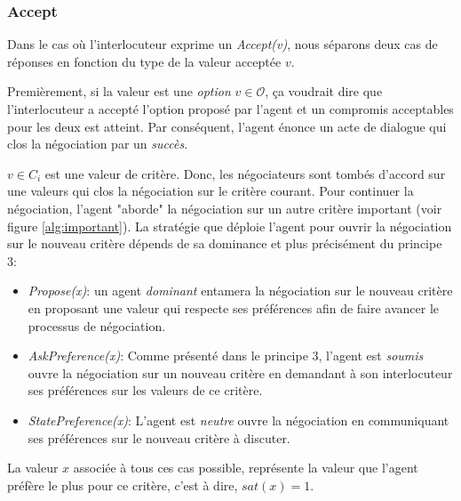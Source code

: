 	
	\subsubsection{Accept}
	Dans le cas où l'interlocuteur exprime un \emph{Accept(v)}, nous séparons deux cas de réponses en fonction du type de la valeur acceptée $v$.
	
	Premièrement, si la valeur est une \textit{option} $ v \in \mathcal{O}$, ça voudrait dire que l'interlocuteur a accepté l'option proposé par l'agent et un compromis acceptables pour les deux est atteint. Par conséquent, l'agent énonce un acte de dialogue qui clos la négociation par un \emph{succès}.
	
	$v \in C_i$ est une valeur de critère. Donc, les négociateurs sont tombés d'accord sur une valeurs qui clos la négociation sur le critère courant. Pour continuer la négociation, l'agent "aborde" la négociation sur un autre critère important (voir figure \ref{alg:important}). La stratégie que déploie l'agent pour ouvrir la négociation sur le nouveau critère dépends de sa dominance et plus précisément du principe 3:
	
	\begin{itemize}
		\item \emph{Propose(x)}: un agent \emph{dominant} entamera la négociation sur le nouveau critère en proposant une valeur qui respecte ses préférences afin de faire avancer le processus de négociation. 
		
		\item \emph{AskPreference(x)}: Comme présenté dans le principe 3, l'agent est \emph{soumis} ouvre la négociation sur un nouveau critère en demandant à son interlocuteur ses préférences sur les valeurs de ce critère.
		
		\item \emph{StatePreference(x)}: L'agent est \emph{neutre} ouvre la négociation en communiquant ses préférences sur le nouveau critère à discuter. 
	\end{itemize}
	La	valeur $x$ associée à tous ces cas possible, représente la valeur que l'agent préfère le plus pour ce critère, c'est à dire, $sat(x) =1$.
	
	
